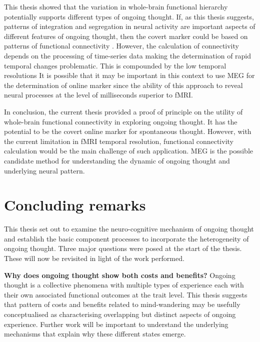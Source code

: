 This thesis showed that the variation in whole-brain functional hierarchy potentially supports different types of ongoing thought. If, as this thesis suggests, patterns of integration and segregation in neural activity are important aspects of different features of ongoing thought, then the covert marker could be based on patterns of functional connectivity . However, the calculation of connectivity depends on the processing of time-series data making the determination of rapid temporal changes problematic. This is compounded by the low temporal resolutions It is possible that it may be important in this context to use MEG for the determination of online marker since the ability of this approach to reveal neural processes at the level of milliseconds superior to fMRI.

In conclusion, the current thesis provided a proof of principle on the utility of whole-brain functional connectivity in exploring ongoing thought. It has the potential to be the covert online marker for spontaneous thought. However, with the current limitation in fMRI temporal resolution, functional connectivity calculation would be the main challenge of such application. MEG is the possible candidate method for understanding the dynamic of ongoing thought and underlying neural pattern.



\section{Concluding remarks}
\label{ch:discussion:summary}

This thesis set out to examine the neuro-cognitive mechanism of ongoing thought and establish the basic component processes to incorporate the heterogeneity of ongoing thought. Three major questions were posed at the start of the thesis. These will now be revisited in light of the work performed.

\textbf{Why does ongoing thought show both costs and benefits?} Ongoing thought is a collective phenomena with multiple types of experience each with their own associated functional outcomes at the trait level. This thesis suggests that pattern of costs and benefits related to mind-wandering may be usefully conceptualised as characterising overlapping but distinct aspects of ongoing experience. Further work will be important to understand the underlying mechanisms that explain why these different states emerge.

